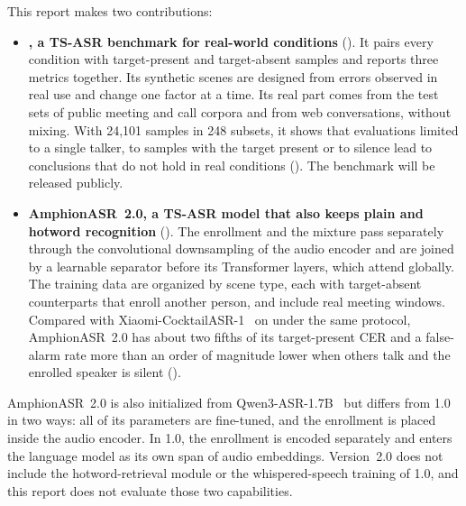 This report makes two contributions:
\begin{itemize}[leftmargin=*, itemsep=2pt]
  \item \textbf{\tsbench, a TS-ASR benchmark for real-world conditions} (). It pairs every condition with target-present and target-absent samples and reports three metrics together. Its synthetic scenes are designed from errors observed in real use and change one factor at a time. Its real part comes from the test sets of public meeting and call corpora and from web conversations, without mixing. With 24{,}101 samples in 248 subsets, it shows that evaluations limited to a single talker, to samples with the target present or to silence lead to conclusions that do not hold in real conditions (). The benchmark will be released publicly.
  \item \textbf{AmphionASR~2.0, a TS-ASR model that also keeps plain and hotword recognition} (). The enrollment and the mixture pass separately through the convolutional downsampling of the audio encoder and are joined by a learnable separator before its Transformer layers, which attend globally. The training data are organized by scene type, each with target-absent counterparts that enroll another person, and include real meeting windows. Compared with Xiaomi-CocktailASR-1~\cite{zhang2026xiaomi} on \tsbench under the same protocol, AmphionASR~2.0 has about two fifths of its target-present CER and a false-alarm rate more than an order of magnitude lower when others talk and the enrolled speaker is silent ().
\end{itemize}

AmphionASR~2.0 is also initialized from Qwen3-ASR-1.7B~\cite{shi2026qwen3asr} but differs from 1.0 in two ways: all of its parameters are fine-tuned, and the enrollment is placed inside the audio encoder.
In 1.0, the enrollment is encoded separately and enters the language model as its own span of audio embeddings.
Version~2.0 does not include the hotword-retrieval module or the whispered-speech training of 1.0, and this report does not evaluate those two capabilities.
